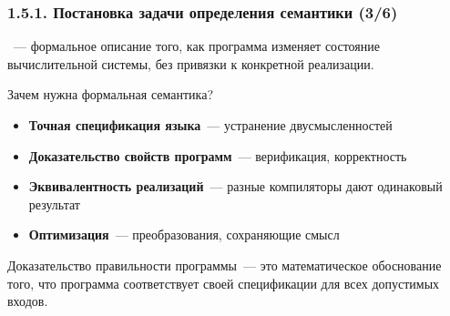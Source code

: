 \begin{frame}
\frametitle{1.5.1. Постановка задачи определения семантики (3/6)}

~--- 
формальное описание того, как программа изменяет состояние 
вычислительной системы, без привязки к конкретной реализации.

\begin{digress}
Зачем нужна формальная семантика?
\begin{itemize}
\item \textbf{Точная спецификация языка}~--- устранение двусмысленностей
\item \textbf{Доказательство свойств программ}~--- верификация, корректность
\item \textbf{Эквивалентность реализаций}~--- разные компиляторы дают одинаковый результат
\item \textbf{Оптимизация}~--- преобразования, сохраняющие смысл
\end{itemize}
\end{digress}

\begin{remark}
Доказательство правильности программы~--- это математическое обоснование того,
что программа соответствует своей спецификации для всех допустимых входов.
\end{remark}

\end{frame}



